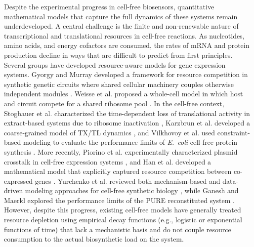 \documentclass[12pt]{article}
\begin{document}
Despite the experimental progress in cell-free biosensors, quantitative mathematical models that capture the full dynamics of these systems remain underdeveloped. A central challenge is the finite and non-renewable nature of transcriptional and translational resources in cell-free reactions. As nucleotides, amino acids, and energy cofactors are consumed, the rates of mRNA and protein production decline in ways that are difficult to predict from first principles. Several groups have developed resource-aware models for gene expression systems. Gyorgy and Murray developed a framework for resource competition in synthetic genetic circuits where shared cellular machinery couples otherwise independent modules \cite{gyorgy2016resource}. Weisse et al. proposed a whole-cell model in which host and circuit compete for a shared ribosome pool \cite{weisse2015mechanistic}. In the cell-free context, Stogbauer et al. characterized the time-dependent loss of translational activity in extract-based systems due to ribosome inactivation \cite{stogbauer2012experiment}, Karzbrun et al. developed a coarse-grained model of TX/TL dynamics \cite{karzbrun2011coarse}, and Vilkhovoy et al. used constraint-based modeling to evaluate the performance limits of \emph{E.~coli} cell-free protein synthesis \cite{Vilkhovoy:2018aa}. More recently, Piorino et al. experimentally characterized plasmid crosstalk in cell-free expression systems \cite{piorino2023plasmid}, and Han et al. developed a mathematical model that explicitly captured resource competition between co-expressed genes \cite{han2025mathematical}. Yurchenko et al. reviewed both mechanism-based and data-driven modeling approaches for cell-free synthetic biology \cite{yurchenko2024mechanism}, while Ganesh and Maerkl explored the performance limits of the PURE reconstituted system \cite{ganesh2024towards}. However, despite this progress, existing cell-free models have generally treated resource depletion using empirical decay functions (e.g., logistic or exponential functions of time) that lack a mechanistic basis and do not couple resource consumption to the actual biosynthetic load on the system.
\end{document}

